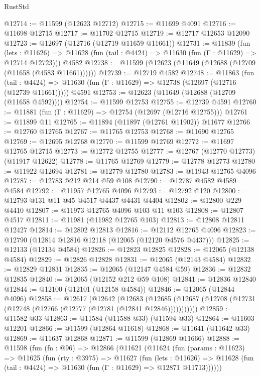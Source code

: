 \begin{lexlean}{RustStd}
\begin{coremodule}
@12714 := @11599 (@12623 @12712)
@12715 := @11699 @4091
@12716 := @11698 @12715
@12717 := @11702 @12715
@12719 := @12717 @12653 @12090
@12723 := @12697 (@12716 (@12719 @11659 @11661))
@12731 := @11839
    (fun (lets : @11626) =>
    @11628 (fun (tail : @4424) => @11630 (fun (Γ : @11629) => @12714 @12723)))
    @4582
@12738 := @11599 (@12623 (@11649 (@12688 (@12709 (@11658 (@4583 @11661))))))
@12739 := @12719 @4582
@12748 := @11863
    (fun (tail : @4424) => @11630 (fun (Γ : @11629) => @12738 (@12697 (@12716 (@12739 @11661)))))
    @4591
@12753 := @12623 (@11649 (@12688 (@12709 (@11658 @4592))))
@12754 := @11599 @12753
@12755 := @12739 @4591
@12760 := @11881 (fun (Γ : @11629) => @12754 (@12697 (@12716 @12755)))
@12761 := @11899 @11
@12765 := @11894 (@11897 (@12761 @11902)) @11677
@12766 := @12760 @12765
@12767 := @11765 @12753
@12768 := @11690 @12765
@12769 := @12695 @12768
@12770 := @11599 @12769
@12772 := @11697 @12765 @12715
@12773 := @12772 @12755
@12777 := @12767 (@12770 @12773) (@11917 @12622)
@12778 := @11765 @12769
@12779 := @12778 @12773
@12780 := @11922 @12694
@12781 := @12779 @12780
@12783 := @11943 @12765 @4096
@12787 := @12783 @212 @214 @59 @108
@12790 := @12787 @4582 @4589 @4584
@12792 := @11957 @12765 @4096
@12793 := @12792 @120
@12800 := @12793 @131 @11 @45 @4517 @4437 @4431 @4404
@12802 := @12800 @229 @4410
@12807 := @11973 @12765 @4096 @103 @11 @103
@12808 := @12807 @4517
@12811 := @11981 (@11982 @12765 @103)
@12813 := @12808 @12811 @12427
@12814 := @12802 @12813
@12816 := @12112 @12765 @4096
@12823 := @12790 (@12814 @12816 @12118 (@12065 (@12120 @4576 @4437)))
@12825 := @12133 (@12134 @4584)
@12826 := @12823 @12825
@12828 := @12065 (@12138 @4584)
@12829 := @12826 @12828
@12831 := @12065 (@12143 @4584)
@12832 := @12829 @12831
@12835 := @12065 (@12147 @4584 @59)
@12836 := @12832 @12835
@12840 := @12065 (@12152 @212 @59 @108)
@12841 := @12836 @12840
@12844 := @12100 (@12101 (@12158 @4584))
@12846 := @12065 (@12844 @4096)
@12858 := @12617
    (@12642
      (@12683
        (@12685 (@12687 (@12708 (@12731 (@12748 (@12766 (@12777 (@12781 (@12841 @12846)))))))))))
@12859 := @11582 @33
@12863 := @11584 (@11588 @33) (@11594 @33)
@12864 := @11603 @12201
@12866 := @11599 (@12864 @11618)
@12868 := @11641 (@11642 @33)
@12869 := @11637 @12868
@12871 := @11599 (@12869 @11666)
@12888 := @11598
    (fun (fn : @96) =>
    @12866
      (@11621
        (@11624
          (fun (params : @11623) =>
          @11625
            (fun (rty : @3975) =>
            @11627
              (fun (lets : @11626) =>
              @11628 (fun (tail : @4424) => @11630 (fun (Γ : @11629) => @12871 @11713))))))

\end{coremodule}
\end{lexlean}
